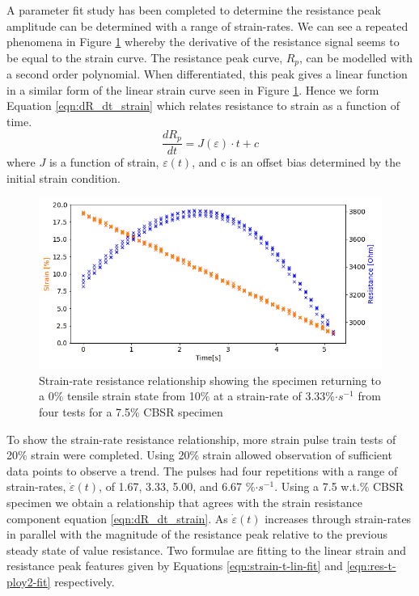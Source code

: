 A parameter fit study has been completed to determine the resistance peak amplitude can be determined with a range of  strain-rates. We can see a repeated phenomena in Figure \ref{fig:poly2_r_strain} whereby the derivative of the resistance signal seems to be equal to the strain curve. The resistance peak curve, $R_p$, can be modelled with a second order polynomial. When differentiated, this peak gives a linear function in a similar form of the linear strain curve seen in Figure \ref{fig:poly2_r_strain}. Hence we form Equation \ref{eqn:dR_dt_strain} which relates resistance to strain as a function of time.
\begin{equation} 
	\frac{dR_p}{dt} = J(\varepsilon) \cdot t + c
	\label{eqn:dR_dt_strain}
\end{equation}
where $J$ is a function of strain, $\varepsilon(t)$, and c is an offset bias determined by the initial strain condition.
\begin{figure}[H]
	\centering
	\includegraphics[width=0.8\linewidth]{Figures/strain_velocity_res_80mms_2_7-5_E4pin_20mm_v11_0.2Strain_velocityprof.png}
	\caption{Strain-rate resistance relationship showing the specimen returning to a 0\% tensile strain state from 10\% at a strain-rate of 3.33\%$\cdot s^{-1}$ from four tests for a 7.5\% CBSR specimen}
	\label{fig:poly2_r_strain}
\end{figure}
To show the strain-rate resistance relationship, more strain pulse train tests of 20\% strain were completed. Using 20\% strain allowed observation of sufficient data points to observe a trend. The pulses had four repetitions with a range of strain-rates, $\dot{\varepsilon}(t)$, of 1.67, 3.33, 5.00, and 6.67 \%${\cdot s^{-1}}$. Using a 7.5 w.t.\% CBSR specimen we obtain a relationship that agrees with the strain resistance component equation \ref{eqn:dR_dt_strain}. As $\dot{\varepsilon}(t)$ increases through strain-rates in parallel with the magnitude of the resistance peak relative to the previous steady state of value resistance. Two formulae are fitting to the linear strain and resistance peak features given by Equations \ref{eqn:strain-t-lin-fit} and \ref{eqn:res-t-ploy2-fit} respectively.
